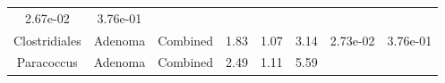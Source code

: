 \documentclass[12pt,]{article}
\begin{document}
\begin{longtable}[]{@{}cccccccc@{}}
\begin{minipage}[t]{0.06\columnwidth}
2.67e-02\strut
\end{minipage} & \begin{minipage}[t]{0.06\columnwidth}\centering\strut
3.76e-01\strut
\end{minipage}\tabularnewline
\begin{minipage}[t]{0.19\columnwidth}\centering\strut
Clostridiales\strut
\end{minipage} & \begin{minipage}[t]{0.07\columnwidth}\centering\strut
Adenoma\strut
\end{minipage} & \begin{minipage}[t]{0.09\columnwidth}\centering\strut
Combined\strut
\end{minipage} & \begin{minipage}[t]{0.03\columnwidth}\centering\strut
1.83\strut
\end{minipage} & \begin{minipage}[t]{0.14\columnwidth}\centering\strut
1.07\strut
\end{minipage} & \begin{minipage}[t]{0.14\columnwidth}\centering\strut
3.14\strut
\end{minipage} & \begin{minipage}[t]{0.06\columnwidth}\centering\strut
2.73e-02\strut
\end{minipage} & \begin{minipage}[t]{0.06\columnwidth}\centering\strut
3.76e-01\strut
\end{minipage}\tabularnewline
\begin{minipage}[t]{0.19\columnwidth}\centering\strut
Paracoccus\strut
\end{minipage} & \begin{minipage}[t]{0.07\columnwidth}\centering\strut
Adenoma\strut
\end{minipage} & \begin{minipage}[t]{0.09\columnwidth}\centering\strut
Combined\strut
\end{minipage} & \begin{minipage}[t]{0.03\columnwidth}\centering\strut
2.49\strut
\end{minipage} & \begin{minipage}[t]{0.14\columnwidth}\centering\strut
1.11\strut
\end{minipage} & \begin{minipage}[t]{0.14\columnwidth}\centering\strut
5.59\strut
\end{minipage} & \begin{minipage}[t]{0.06\columnwidth}\centering\strut

\end{minipage}
\end{longtable}
\end{document}
